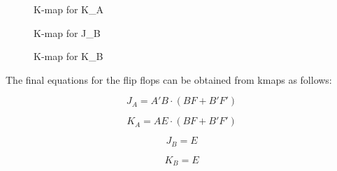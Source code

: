 \documentclass[table ]{article}
\begin{document}
\begin{figure}[H]
    \centering
    \begin{karnaugh-map}[4][4][1][$F$][$E$][$B$][$A$]
    \end{karnaugh-map}
    
    
    \caption{K-map for K\_A}
    \label{fig:kmap_ka}
    \end{figure}




\begin{figure}[H]
    \centering
    \begin{karnaugh-map}[4][4][1][$F$][$E$][$B$][$A$]
    \end{karnaugh-map}
    
    
    \caption{K-map for J\_B}
    \label{fig:kmap_jb}
    \end{figure}


\begin{figure}[H]
    \centering
    \begin{karnaugh-map}[4][4][1][$F$][$E$][$B$][$A$]

        
    \end{karnaugh-map}
    
    \caption{K-map for K\_B}
    \label{fig:kmap_kb}
    \end{figure}


The final equations for the flip flops can be obtained from kmaps as follows:

\begin{equation}
    J_A = A'B \cdot (BF + B'F')
\end{equation}

\begin{equation}
    K_A = AE \cdot (BF + B'F')
\end{equation}

\begin{equation}
    J_B = E
\end{equation}

\begin{equation}
    K_B = E
\end{equation}
\end{document}
